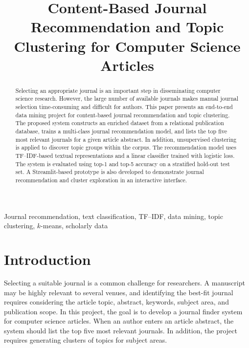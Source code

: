 \documentclass[conference]{IEEEtran}
\begin{document}
\title{Content-Based Journal Recommendation and Topic Clustering for Computer Science Articles}

\author{
}

\maketitle

\begin{abstract}
Selecting an appropriate journal is an important step in disseminating computer science research. However, the large number of available journals makes manual journal selection time-consuming and difficult for authors. This paper presents an end-to-end data mining project for content-based journal recommendation and topic clustering. The proposed system constructs an enriched dataset from a relational publication database, trains a multi-class journal recommendation model, and lists the top five most relevant journals for a given article abstract. In addition, unsupervised clustering is applied to discover topic groups within the corpus. The recommendation model uses TF--IDF-based textual representations and a linear classifier trained with logistic loss. The system is evaluated using top-1 and top-5 accuracy on a stratified hold-out test set. A Streamlit-based prototype is also developed to demonstrate journal recommendation and cluster exploration in an interactive interface.
\end{abstract}

\begin{IEEEkeywords}
Journal recommendation, text classification, TF--IDF, data mining, topic clustering, $k$-means, scholarly data
\end{IEEEkeywords}

\section{Introduction}
Selecting a suitable journal is a common challenge for researchers. A manuscript may be highly relevant to several venues, and identifying the best-fit journal requires considering the article topic, abstract, keywords, subject area, and publication scope. In this project, the goal is to develop a journal finder system for computer science articles. When an author enters an article abstract, the system should list the top five most relevant journals. In addition, the project requires generating clusters of topics for subject areas.
\end{document}
